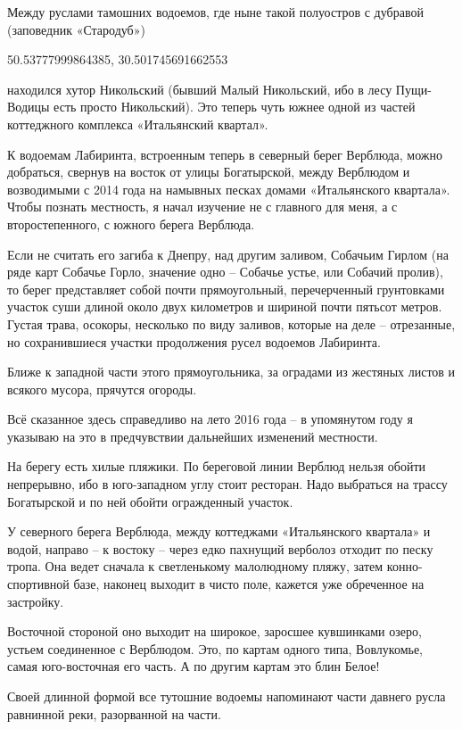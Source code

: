 Между руслами тамошних водоемов, где ныне такой полуостров с дубравой (заповедник «Стародуб»)

50.53777999864385, 30.501745691662553

находился хутор Никольский (бывший Малый Никольский, ибо в лесу Пущи-Водицы есть просто Никольский). Это теперь чуть южнее одной из частей коттеджного комплекса «Итальянский квартал».

К водоемам Лабиринта, встроенным теперь в северный берег Верблюда, можно добраться, свернув на восток от улицы Богатырской, между Верблюдом и возводимыми с 2014 года на намывных песках домами «Итальянского квартала». Чтобы познать местность, я начал изучение не с главного для меня, а с второстепенного, с южного берега Верблюда.

Если не считать его загиба к Днепру, над другим заливом, Собачьим Гирлом (на ряде карт Собачье Горло, значение одно – Собачье устье, или Собачий пролив), то берег представляет собой почти прямоугольный, перечерченный грунтовками участок суши длиной около двух километров и шириной почти пятьсот метров. Густая трава, осокоры, несколько по виду заливов, которые на деле – отрезанные, но сохранившиеся участки продолжения русел 
водоемов Лабиринта.

Ближе к западной части этого прямоугольника, за оградами из жестяных листов и всякого мусора, прячутся огороды.

Всё сказанное здесь справедливо на лето 2016 года – в упомянутом году я указываю на это в предчувствии дальнейших изменений местности.

На берегу есть хилые пляжики. По береговой линии Верблюд нельзя обойти непрерывно, ибо в юго-западном углу стоит ресторан. Надо выбраться на трассу Богатырской и по ней обойти огражденный участок.

У северного берега Верблюда, между коттеджами «Итальянского квартала» и водой, направо – к востоку – через едко пахнущий верболоз отходит по песку тропа. Она ведет сначала к светленькому малолюдному пляжу, затем конно-спортивной базе, наконец выходит в чисто поле, кажется уже обреченное на застройку.

Восточной стороной оно выходит на широкое, заросшее кувшинками озеро, устьем соединенное с Верблюдом. Это, по картам одного типа, Вовлукомье, самая юго-восточная его часть. А по другим картам это блин Белое!

Своей длинной формой все тутошние водоемы напоминают части давнего русла равнинной реки, разорванной на части. 

